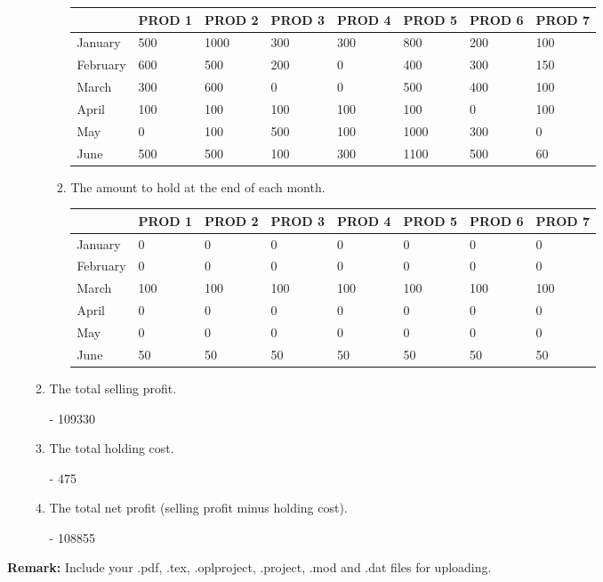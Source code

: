\documentclass[12pt,a4paper]{article}
\theoremstyle{definition}
\begin{document}
\begin{enumerate}
\begin{enumerate}
\begin{enumerate}
	\scriptsize
	\renewcommand\arraystretch{1.1}
	\begin{tabular}{m{} m{}<{\centering} m{}<{\centering} m{}<{\centering} m{}<{\centering} m{}<{\centering} m{}<{\centering} m{}<{\centering}}
		\hline
		& \textbf{PROD 1} & \textbf{PROD 2} & \textbf{PROD 3} & \textbf{PROD 4} & \textbf{PROD 5} & \textbf{PROD 6} &  \textbf{PROD 7} \\\hline
		January & 500 & 1000 & 300 & 300 & 800 & 200 & 100 \\
		February & 600 & 500 & 200 & 0 & 400 & 300 & 150 \\
		March & 300 & 600 & 0 & 0 & 500 & 400 & 100 \\
		April & 100 & 100 & 100 & 100 & 100 & 0 & 100 \\
		May & 0 & 100 & 500 & 100 & 1000 & 300 & 0 \\
		June & 500 & 500 & 100 & 300 & 1100 & 500 & 60 \\
		\hline
	\end{tabular}

\item
The amount to hold at the end of each month.

	\scriptsize
	\renewcommand\arraystretch{1.1}
	\begin{tabular}{m{} m{}<{\centering} m{}<{\centering} m{}<{\centering} m{}<{\centering} m{}<{\centering} m{}<{\centering} m{}<{\centering}}
		\hline
		& \textbf{PROD 1} & \textbf{PROD 2} & \textbf{PROD 3} & \textbf{PROD 4} & \textbf{PROD 5} & \textbf{PROD 6} &  \textbf{PROD 7} \\\hline
		January & 0 & 0 & 0 & 0 & 0 & 0 & 0 \\
		February & 0 & 0 & 0 & 0 & 0 & 0 & 0 \\
		March & 100 & 100 & 100 & 100 & 100 & 100 & 100 \\
		April & 0 & 0 & 0 & 0 & 0 & 0 & 0 \\
		May & 0 & 0 & 0 & 0 & 0 & 0 & 0 \\
		June & 50 & 50 & 50 & 50 &50 & 50 & 50 \\
		\hline
	\end{tabular}
\end{enumerate}
\item
The total selling profit.\par
- 109330
\item
The total holding cost.\par
- 475
\item
The total net profit (selling profit minus holding cost).\par
- 108855
\end{enumerate}
\end{enumerate}

\textbf{Remark:} Include your .pdf, .tex, .oplproject, .project, .mod and .dat files for uploading.


\end{document}
